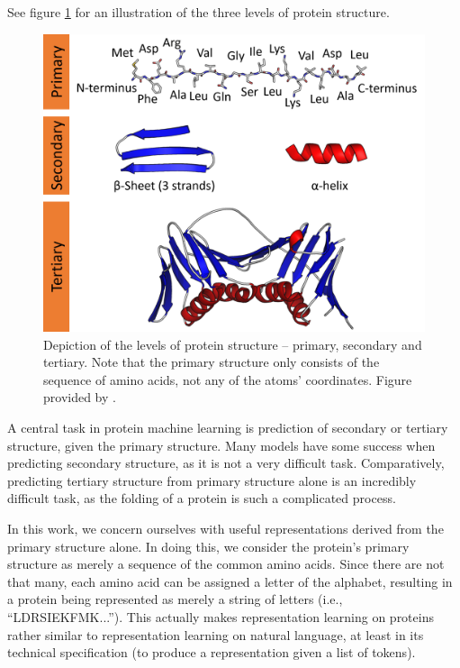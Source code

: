 See figure \ref{fig:protein_structure} for an illustration of the three levels of protein structure.

\begin{figure}[ht]
    \centering
    \includegraphics[width = 0.75\linewidth]{report/figures/protein_structure.png}
    \caption{Depiction of the levels of protein structure -- primary, secondary and tertiary. Note that the primary structure only consists of the sequence of amino acids, not any of the atoms' coordinates. Figure provided by \textcite{protein_structure_fig}.}
    \label{fig:protein_structure}
\end{figure}

A central task in protein machine learning is prediction of secondary or tertiary structure, given the primary structure. Many models have some success when predicting secondary structure, as it is not a very difficult task. Comparatively, predicting tertiary structure from primary structure alone is an incredibly difficult task, as the folding of a protein is such a complicated process.


In this work, we concern ourselves with useful representations derived from the primary structure alone. In doing this, we consider the protein's primary structure as merely a sequence of the common amino acids. Since there are not that many, each amino acid can be assigned a letter of the alphabet, resulting in a protein being represented as merely a string of letters (i.e., ``LDRSIEKFMK...''). This actually makes representation learning on proteins rather similar to representation learning on natural language, at least in its technical specification (to produce a representation given a list of tokens).

